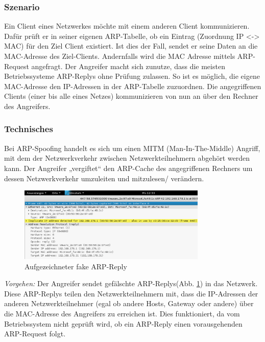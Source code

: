 \subsubsection*{Szenario}
Ein Client eines Netzwerkes möchte mit einem anderen Client kommunizieren. Dafür prüft er in seiner eigenen ARP-Tabelle, ob ein Eintrag (Zuordnung IP <-> MAC) für den Ziel Client existiert. Ist dies der Fall, sendet er seine Daten an die MAC-Adresse des Ziel-Clients. Andernfalls wird die MAC Adresse mittels ARP-Request angefragt.
Der Angreifer macht sich zunutze, dass die meisten Betriebssysteme ARP-Replys ohne Prüfung zulassen. So ist es möglich, die eigene MAC-Adresse den IP-Adressen in der ARP-Tabelle zuzuordnen. Die angegriffenen Clients (einer bis alle eines Netzes) kommunizieren von nun an über den Rechner des Angreifers.



\subsubsection*{Technisches}
Bei ARP-Spoofing handelt es sich um einen MITM (Man-In-The-Middle) Angriff, mit dem der Netzwerkverkehr zwischen Netzwerkteilnehmern abgehört werden kann.
Der Angreifer „vergiftet“ den ARP-Cache des angegriffenen Rechners um dessen Netzwerkverkehr umzuleiten und mitzulesen/ verändern.

\begin{figure}[h!]
	\centering
		\includegraphics[width=0.80\textwidth]{bilder/arpSpoofing/fake_arp_small.pdf}
	\caption{Aufgezeichneter fake ARP-Reply}
	\label{fig:fake_arp_small}
\end{figure}

\textit{Vorgehen:}
Der Angreifer sendet gefälschte ARP-Replys(Abb. \ref{fig:fake_arp_small}) in das Netzwerk. Diese ARP-Replys teilen den Netzwerkteilnehmern mit, dass die IP-Adressen der anderen Netzwerkteilnehmer (egal ob andere Hosts, Gateway oder andere) über die MAC-Adresse des Angreifers zu erreichen ist. Dies funktioniert, da vom Betriebssystem nicht geprüft wird, ob ein ARP-Reply einen vorausgehenden ARP-Request folgt.

